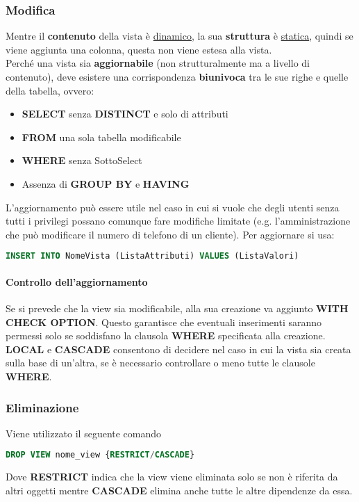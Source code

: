 \subsubsection{Modifica}
Mentre il \textbf{contenuto} della vista è \underline{dinamico}, la sua \textbf{struttura} è \underline{statica}, quindi se viene aggiunta una colonna, questa non viene estesa alla vista.\\
Perché una vista sia \textbf{aggiornabile} (non strutturalmente ma a livello di contenuto), deve esistere una corrispondenza \textbf{biunivoca} tra le sue righe e quelle della tabella, ovvero:
\begin{itemize}
	\item \textbf{SELECT} senza \textbf{DISTINCT} e solo di attributi
	\item \textbf{FROM} una sola tabella modificabile
	\item \textbf{WHERE} senza SottoSelect
	\item Assenza di \textbf{GROUP BY} e \textbf{HAVING}
\end{itemize}
L'aggiornamento può essere utile nel caso in cui si vuole che degli utenti senza tutti i privilegi possano comunque fare modifiche limitate (e.g. l'amministrazione che può modificare il numero di telefono di un cliente). Per aggiornare si usa:
\begin{lstlisting}[language=SQL]
	INSERT INTO NomeVista (ListaAttributi) VALUES (ListaValori)
\end{lstlisting}
\paragraph{Controllo dell'aggiornamento}
Se si prevede che la view sia modificabile, alla sua creazione va aggiunto \textbf{WITH CHECK OPTION}. Questo garantisce che eventuali inserimenti saranno permessi solo se soddisfano la clausola \textbf{WHERE} specificata alla creazione. \textbf{LOCAL} e \textbf{CASCADE} consentono di decidere nel caso in cui la vista sia creata sulla base di un'altra, se è necessario controllare o meno tutte le clausole \textbf{WHERE}.

\subsubsection{Eliminazione}
Viene utilizzato il seguente comando
\begin{lstlisting}[language=SQL]
	DROP VIEW nome_view {RESTRICT/CASCADE}
\end{lstlisting}
Dove \textbf{RESTRICT} indica che la view viene eliminata solo se non è riferita da altri oggetti mentre \textbf{CASCADE} elimina anche tutte le altre dipendenze da essa.

